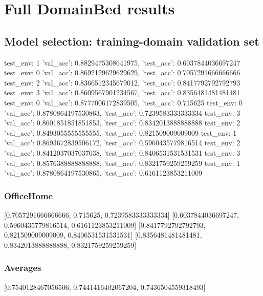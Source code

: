 \documentclass{article}
\begin{document}
\section{Full DomainBed results}

\subsection{Model selection: training-domain validation set}
test_env: 1
{'val_acc': 0.8829475308641975, 'test_acc': 0.6037844036697247}
test_env: 0
{'val_acc': 0.8692129629629629, 'test_acc': 0.7057291666666666}
test_env: 2
{'val_acc': 0.8366512345679012, 'test_acc': 0.8417792792792793}
test_env: 3
{'val_acc': 0.8609567901234567, 'test_acc': 0.8356481481481481}
test_env: 0
{'val_acc': 0.8777006172839505, 'test_acc': 0.715625}
test_env: 0
{'val_acc': 0.8780864197530863, 'test_acc': 0.7239583333333334}
test_env: 3
{'val_acc': 0.8601851851851853, 'test_acc': 0.8342013888888888}
test_env: 2
{'val_acc': 0.8493055555555555, 'test_acc': 0.821509009009009}
test_env: 1
{'val_acc': 0.8693672839506172, 'test_acc': 0.5960435779816514}
test_env: 2
{'val_acc': 0.8412037037037038, 'test_acc': 0.8406531531531531}
test_env: 3
{'val_acc': 0.8576388888888888, 'test_acc': 0.8321759259259259}
test_env: 1
{'val_acc': 0.8780864197530865, 'test_acc': 0.6161123853211009}

\subsubsection{OfficeHome}
[0.7057291666666666, 0.715625, 0.7239583333333334]
[0.6037844036697247, 0.5960435779816514, 0.6161123853211009]
[0.8417792792792793, 0.821509009009009, 0.8406531531531531]
[0.8356481481481481, 0.8342013888888888, 0.8321759259259259]

\begin{center}
\end{center}

\subsubsection{Averages}
[0.7540128467056506, 0.7441416402067204, 0.7436504559318493]

\begin{center}
\end{center}
\end{document}
